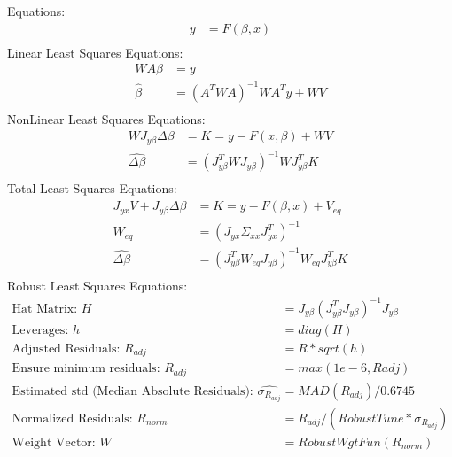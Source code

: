 \documentclass{report}
\begin{document}
	Equations:
	\begin{align*}
		y &= F(\beta,x) \\ 
	\end{align*}
	Linear Least Squares Equations:
	\begin{align*}
		WA\beta &= y \\
		\hat{\beta} &= (A^TWA)^{-1}WA^Ty + WV\\
	\end{align*}
	NonLinear Least Squares Equations:
	\begin{align*}
		WJ_{y\beta}\Delta\beta &= K = y - F(x,\beta) + WV \\
		\hat{\Delta\beta} &= (J_{y\beta}^TWJ_{y\beta})^{-1}WJ_{y\beta}^TK \\
	\end{align*}
	Total Least Squares Equations:
	\begin{align*}
		J_{yx}V + J_{y\beta}\Delta\beta &= K = y - F(\beta,x) + V_{eq} \\
		W_{eq} &= (J_{yx}\Sigma_{xx}J_{yx}^T)^{-1} \\
		\hat{\Delta\beta} &= (J_{y\beta}^TW_{eq}J_{y\beta})^{-1}W_{eq}J_{y\beta}^TK \\
	\end{align*}
	Robust Least Squares Equations:
	\begin{align*}
		\text{Hat Matrix: } H &= J_{y\beta} (J_{y\beta}^TJ_{y\beta})^{-1} J_{y\beta} \\
		\text{Leverages: }h &= diag(H) \\
		\text{Adjusted Residuals: }R_{adj} &= R*sqrt(h) \\
		\text{Ensure minimum residuals: }R_{adj} &= max(1e-6,R{adj}) \\
		\text{Estimated std (Median Absolute Residuals): }\hat{\sigma_{R_{adj}}} &= MAD(R_{adj})/0.6745 \\
		\text{Normalized Residuals: }R_{norm} &= R_{adj}/(RobustTune * {\sigma_{R_{adj}}}) \\
		\text{Weight Vector: }W &= RobustWgtFun(R_{norm}) \\
	\end{align*}
\end{document}
